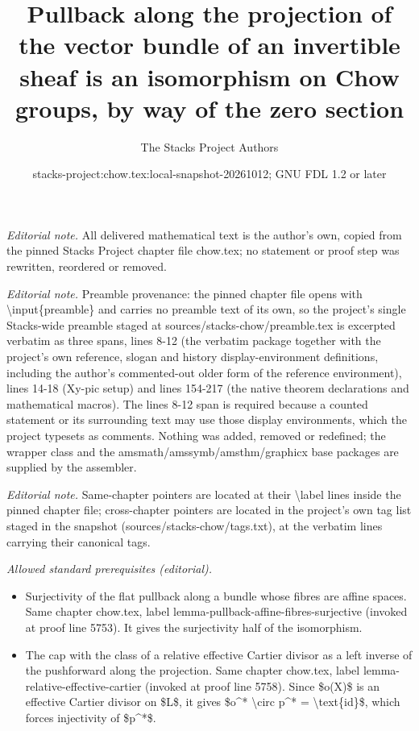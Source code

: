 \documentclass[10pt,a4paper]{amsart}
\title{Pullback along the projection of the vector bundle of an invertible sheaf is an isomorphism on Chow groups, by way of the zero section}
\author{The Stacks Project Authors}
\date{stacks-project:chow.tex:local-snapshot-20261012; GNU FDL 1.2 or later}
\theoremstyle{plain}
\theoremstyle{definition}
\theoremstyle{remark}
\numberwithin{equation}{subsection}
\begin{document}
\maketitle
\noindent\textit{Editorial note.} All delivered mathematical text is the author's own, copied from the pinned Stacks Project chapter file chow.tex; no statement or proof step was rewritten, reordered or removed.\par\medskip
\noindent\textit{Editorial note.} Preamble provenance: the pinned chapter file opens with \textbackslash{}input\{preamble\} and carries no preamble text of its own, so the project's single Stacks-wide preamble staged at sources/stacks-chow/preamble.tex is excerpted verbatim as three spans, lines 8-12 (the verbatim package together with the project's own reference, slogan and history display-environment definitions, including the author's commented-out older form of the reference environment), lines 14-18 (Xy-pic setup) and lines 154-217 (the native theorem declarations and mathematical macros). The lines 8-12 span is required because a counted statement or its surrounding text may use those display environments, which the project typesets as comments. Nothing was added, removed or redefined; the wrapper class and the amsmath/amssymb/amsthm/graphicx base packages are supplied by the assembler.\par\medskip
\noindent\textit{Editorial note.} Same-chapter pointers are located at their \textbackslash{}label lines inside the pinned chapter file; cross-chapter pointers are located in the project's own tag list staged in the snapshot (sources/stacks-chow/tags.txt), at the verbatim lines carrying their canonical tags.\par\medskip
\noindent\textit{Allowed standard prerequisites (editorial).}\begin{itemize}
\item Surjectivity of the flat pullback along a bundle whose fibres are affine spaces. Same chapter chow.tex, label lemma-pullback-affine-fibres-surjective (invoked at proof line 5753). It gives the surjectivity half of the isomorphism.
\item The cap with the class of a relative effective Cartier divisor as a left inverse of the pushforward along the projection. Same chapter chow.tex, label lemma-relative-effective-cartier (invoked at proof line 5758). Since \$o(X)\$ is an effective Cartier divisor on \$L\$, it gives \$o\textasciicircum{}* \textbackslash{}circ p\textasciicircum{}* = \textbackslash{}text\{id\}\$, which forces injectivity of \$p\textasciicircum{}*\$.
\end{itemize}\medskip
\end{document}
